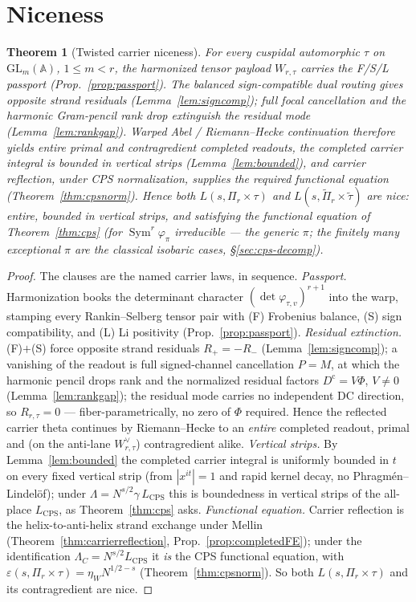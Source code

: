 \documentclass[11pt]{article}
\newtheorem{theorem}{Theorem}
\theoremstyle{definition}
\newcommand{\Sym}{\operatorname{Sym}}
\begin{document}
\section{Niceness}\label{sec:cps-nice}
\begin{theorem}[Twisted carrier niceness]\label{thm:cps-nice}
For every cuspidal automorphic $\tau$ on $\mathrm{GL}_m(\mathbb A)$, $1\le m<r$, the harmonized tensor payload
$W_{r,\tau}$ carries the F/S/L passport (Prop.~\ref{prop:passport}). The balanced sign-compatible dual routing
gives opposite strand residuals (Lemma~\ref{lem:signcomp}); full focal cancellation and the harmonic
Gram-pencil rank drop extinguish the residual mode (Lemma~\ref{lem:rankgap}). Warped Abel / Riemann--Hecke
continuation therefore yields entire primal and contragredient completed readouts, the completed carrier
integral is bounded in vertical strips (Lemma~\ref{lem:bounded}), and carrier reflection, under CPS
normalization, supplies the required functional equation (Theorem~\ref{thm:cpsnorm}). Hence both
$L(s,\Pi_r\times\tau)$ and $L(s,\widetilde\Pi_r\times\widetilde\tau)$ are \emph{nice}: entire, bounded in
vertical strips, and satisfying the functional equation of Theorem~\ref{thm:cps} (for $\Sym^r\varphi_\pi$
irreducible --- the generic $\pi$; the finitely many exceptional $\pi$ are the classical isobaric cases,
\S\ref{sec:cps-decomp}).
\end{theorem}
\begin{proof}
The clauses are the named carrier laws, in sequence.
\emph{Passport.} Harmonization books the determinant character $(\det\varphi_{\tau,v})^{r+1}$ into the warp,
stamping every Rankin--Selberg tensor pair with (F) Frobenius balance, (S) sign compatibility, and (L) Li
positivity (Prop.~\ref{prop:passport}).
\emph{Residual extinction.} (F)$+$(S) force opposite strand residuals $R_+=-R_-$ (Lemma~\ref{lem:signcomp}); a
vanishing of the readout is full signed-channel cancellation $P=M$, at which the harmonic pencil drops rank and
the normalized residual factors $D^{\mathrm c}=V\Phi$, $V\neq0$ (Lemma~\ref{lem:rankgap}); the residual mode
carries no independent DC direction, so $R_{r,\tau}=0$ --- fiber-parametrically, no zero of $\Phi$ required.
Hence the reflected carrier theta continues by Riemann--Hecke to an \emph{entire} completed readout, primal and
(on the anti-lane $W_{r,\tau}^\vee$) contragredient alike.
\emph{Vertical strips.} By Lemma~\ref{lem:bounded} the completed carrier integral is uniformly bounded in $t$ on
every fixed vertical strip (from $|x^{it}|=1$ and rapid kernel decay, no Phragm\'en--Lindel\"of); under
$\Lambda=N^{s/2}\gamma\,L_{\mathrm{CPS}}$ this is boundedness in vertical strips of the all-place
$L_{\mathrm{CPS}}$, as Theorem~\ref{thm:cps} asks.
\emph{Functional equation.} Carrier reflection is the helix-to-anti-helix strand exchange under Mellin
(Theorem~\ref{thm:carrierreflection}, Prop.~\ref{prop:completedFE}); under the identification
$\Lambda_C=N^{s/2}L_{\mathrm{CPS}}$ it \emph{is} the CPS functional equation, with
$\varepsilon(s,\Pi_r\times\tau)=\eta_W N^{1/2-s}$ (Theorem~\ref{thm:cpsnorm}). So both $L(s,\Pi_r\times\tau)$
and its contragredient are nice.
\end{proof}
\end{document}

